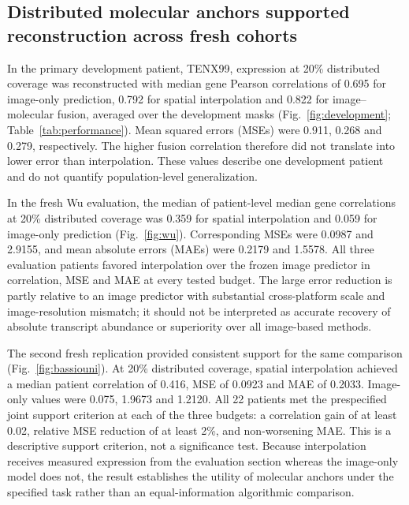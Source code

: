 


\FloatBarrier

\subsection{Distributed molecular anchors supported reconstruction across fresh cohorts}
In the primary development patient, TENX99, expression at 20\% distributed coverage was reconstructed with median gene Pearson correlations of 0.695 for image-only prediction, 0.792 for spatial interpolation and 0.822 for image--molecular fusion, averaged over the development masks (Fig.~\ref{fig:development}; Table~\ref{tab:performance}). Mean squared errors (MSEs) were 0.911, 0.268 and 0.279, respectively. The higher fusion correlation therefore did not translate into lower error than interpolation. These values describe one development patient and do not quantify population-level generalization.



In the fresh Wu evaluation, the median of patient-level median gene correlations at 20\% distributed coverage was 0.359 for spatial interpolation and 0.059 for image-only prediction (Fig.~\ref{fig:wu}). Corresponding MSEs were 0.0987 and 2.9155, and mean absolute errors (MAEs) were 0.2179 and 1.5578. All three evaluation patients favored interpolation over the frozen image predictor in correlation, MSE and MAE at every tested budget. The large error reduction is partly relative to an image predictor with substantial cross-platform scale and image-resolution mismatch; it should not be interpreted as accurate recovery of absolute transcript abundance or superiority over all image-based methods.



The second fresh replication provided consistent support for the same comparison (Fig.~\ref{fig:bassiouni}). At 20\% distributed coverage, spatial interpolation achieved a median patient correlation of 0.416, MSE of 0.0923 and MAE of 0.2033. Image-only values were 0.075, 1.9673 and 1.2120. All 22 patients met the prespecified joint support criterion at each of the three budgets: a correlation gain of at least 0.02, relative MSE reduction of at least 2\%, and non-worsening MAE. This is a descriptive support criterion, not a significance test. Because interpolation receives measured expression from the evaluation section whereas the image-only model does not, the result establishes the utility of molecular anchors under the specified task rather than an equal-information algorithmic comparison.

